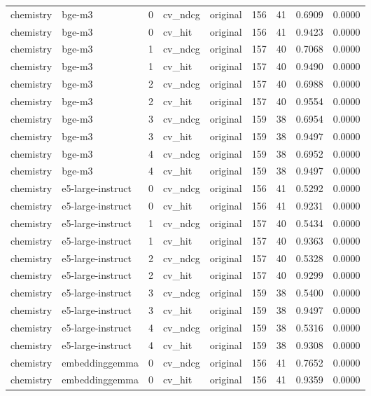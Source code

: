 \begin{tabular}{llrllrrrr}
chemistry & bge-m3 & 0 & cv\_ndcg & original & 156 & 41 & 0.6909 & 0.0000 \\
chemistry & bge-m3 & 0 & cv\_hit & original & 156 & 41 & 0.9423 & 0.0000 \\
chemistry & bge-m3 & 1 & cv\_ndcg & original & 157 & 40 & 0.7068 & 0.0000 \\
chemistry & bge-m3 & 1 & cv\_hit & original & 157 & 40 & 0.9490 & 0.0000 \\
chemistry & bge-m3 & 2 & cv\_ndcg & original & 157 & 40 & 0.6988 & 0.0000 \\
chemistry & bge-m3 & 2 & cv\_hit & original & 157 & 40 & 0.9554 & 0.0000 \\
chemistry & bge-m3 & 3 & cv\_ndcg & original & 159 & 38 & 0.6954 & 0.0000 \\
chemistry & bge-m3 & 3 & cv\_hit & original & 159 & 38 & 0.9497 & 0.0000 \\
chemistry & bge-m3 & 4 & cv\_ndcg & original & 159 & 38 & 0.6952 & 0.0000 \\
chemistry & bge-m3 & 4 & cv\_hit & original & 159 & 38 & 0.9497 & 0.0000 \\
chemistry & e5-large-instruct & 0 & cv\_ndcg & original & 156 & 41 & 0.5292 & 0.0000 \\
chemistry & e5-large-instruct & 0 & cv\_hit & original & 156 & 41 & 0.9231 & 0.0000 \\
chemistry & e5-large-instruct & 1 & cv\_ndcg & original & 157 & 40 & 0.5434 & 0.0000 \\
chemistry & e5-large-instruct & 1 & cv\_hit & original & 157 & 40 & 0.9363 & 0.0000 \\
chemistry & e5-large-instruct & 2 & cv\_ndcg & original & 157 & 40 & 0.5328 & 0.0000 \\
chemistry & e5-large-instruct & 2 & cv\_hit & original & 157 & 40 & 0.9299 & 0.0000 \\
chemistry & e5-large-instruct & 3 & cv\_ndcg & original & 159 & 38 & 0.5400 & 0.0000 \\
chemistry & e5-large-instruct & 3 & cv\_hit & original & 159 & 38 & 0.9497 & 0.0000 \\
chemistry & e5-large-instruct & 4 & cv\_ndcg & original & 159 & 38 & 0.5316 & 0.0000 \\
chemistry & e5-large-instruct & 4 & cv\_hit & original & 159 & 38 & 0.9308 & 0.0000 \\
chemistry & embeddinggemma & 0 & cv\_ndcg & original & 156 & 41 & 0.7652 & 0.0000 \\
chemistry & embeddinggemma & 0 & cv\_hit & original & 156 & 41 & 0.9359 & 0.0000 \\

\end{tabular}
